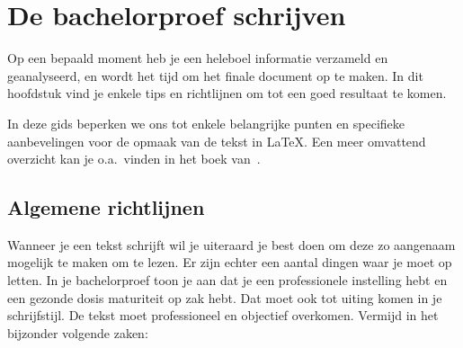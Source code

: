 \chapter{De bachelorproef schrijven}
\label{ch:schrijven}

%

%
%

Op een bepaald moment heb je een heleboel informatie verzameld en geanalyseerd, en wordt het tijd om het finale document op te maken. In dit hoofdstuk vind je enkele tips en richtlijnen om tot een goed resultaat te komen.

In deze gids beperken we ons tot enkele belangrijke punten en specifieke aanbevelingen voor de opmaak van de tekst in {\LaTeX}. Een meer omvattend overzicht kan je o.a.~vinden in het boek van~\textcite{Pollefliet2011}.

\section{Algemene richtlijnen}
\label{ch:algemene-richtlijnen}

Wanneer je een tekst schrijft wil je uiteraard je best doen om deze zo aangenaam mogelijk te maken om te lezen. Er zijn echter een aantal dingen waar je moet op letten. In je bachelorproef toon je aan dat je een professionele instelling hebt en een gezonde dosis maturiteit op zak hebt. Dat moet ook tot uiting komen in je schrijfstijl. De tekst moet professioneel en objectief overkomen. Vermijd in het bijzonder volgende zaken:


